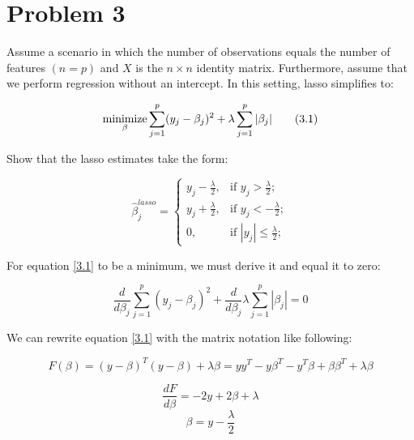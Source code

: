 \section*{Problem 3}

Assume a scenario in which the number of observations equals the number of features $(n=p)$ and $X$ is the $n \times n$ identity matrix. Furthermore, assume that we perform regression without an intercept. In this setting, lasso simplifies to:



\[
\operatorname*{minimize}_{\beta} \sum_{j=1}^{p} (y_j - \beta_j)^2 + \lambda \sum_{j=1}^{p} |\beta_j| \tag{3.1} \label{3.1}
\]

Show that the lasso estimates take the form: 

\[ 
  \tag{3.2} \label{3.2}
  \hat{\beta}_{j}^{lasso}=
  \begin{cases}
		y_j - \frac{\lambda}{2}, &\text{if } y_j > \frac{\lambda}{2};\\
		y_j + \frac{\lambda}{2}, &\text{if } y_j < -\frac{\lambda}{2};\\
		0,                       &\text{if } |y_j| \leq \frac{\lambda}{2};
	\end{cases} 
\]

For equation \ref{3.1} to be a minimum, we must derive it and equal it to zero:

\[ 
\tag{3.3}\label{3.3}
	\frac{d}{d\beta_j} \sum_{j=1}^{p} (y_j - \beta_j)^2 + \frac{d}{d\beta_j} \lambda \sum_{j=1}^{p} |\beta_j| = 0
 \]
 
 We can rewrite equation \ref{3.1} with the matrix notation like following:
 
 \[ 
	 F(\beta) = (y - \beta)^T (y - \beta) + \lambda \beta 
	 = yy^T - y\beta^T -y^T\beta + \beta\beta^T + \lambda\beta
  \]
 
 

 \[ \frac{dF}{d\beta} = -2y + 2\beta + \lambda \]
 \[ \beta = y - \frac{\lambda}{2} \]
 
 
 \[  \]